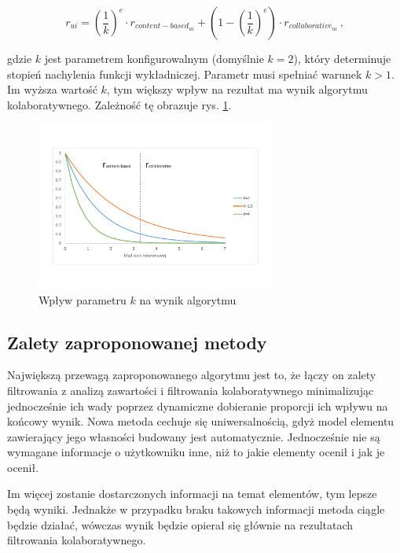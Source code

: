 \documentclass[twoside]{iisthesis}
\begin{document}
		 \begin{equation}
		 	\label{eq:hybrid}		 	
		 	 r_{ui} = (\frac{1}{k})^e \cdot r_{content-based_{ui}} + (1-(\frac{1}{k})^e) \cdot r_{collaborative_{ui}}
		 	\,,
		 \end{equation}
		 
		 gdzie $k$ jest parametrem konfigurowalnym (domyślnie $k = 2$), który determinuje stopień nachylenia funkcji wykładniczej. Parametr musi spełniać warunek $k>1$. Im wyższa wartość $k$, tym większy wpływ na rezultat ma wynik algorytmu kolaboratywnego. Zależność tę obrazuje rys. \ref{fig:hybridfunction}.
		 
		 \begin{figure}[!ht] 
		 	\centering
		 	\includegraphics[width=0.7\textwidth]{hybridfunction}
		 	\caption{Wpływ parametru $k$ na wynik algorytmu}
		 	\label{fig:hybridfunction}
		 \end{figure}
	 
		 \subsection{Zalety zaproponowanej metody}
		 
		 Największą przewagą zaproponowanego algorytmu jest to, że łączy on zalety filtrowania z analizą zawartości i filtrowania kolaboratywnego minimalizując jednocześnie ich wady poprzez dynamiczne dobieranie proporcji ich wpływu na końcowy wynik. Nowa metoda cechuje się uniwersalnością, gdyż model elementu zawierający jego własności budowany jest automatycznie. Jednocześnie nie są wymagane informacje o użytkowniku inne, niż to jakie elementy ocenił i jak je ocenił. 
		 
		 Im więcej zostanie dostarczonych informacji na temat elementów, tym lepsze będą wyniki. Jednakże w przypadku braku takowych informacji metoda ciągle będzie działać,  wówczas wynik będzie opierał się głównie na rezultatach filtrowania kolaboratywnego.
		 
\end{document}
